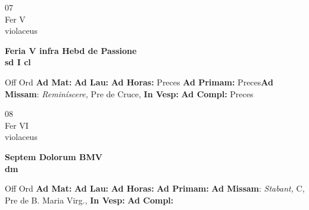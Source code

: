 \documentclass[10pt, openany]{book}
\begin{document}
        \begin{center}
            \begin{minipage}{3.5in}
                \vspace{2em}
                \begin{minipage}{0.5in}
                    {\Huge 07} \\
                    {\normalsize Fer V} \\
                    {\normalsize violaceus}
                \end{minipage}
                \begin{minipage}{3.0in}
                    \textbf{ \large Feria V infra Hebd de Passione \\
                    \textnormal{\normalsize sd I cl}} \\ 
                \end{minipage}
                \begin{justify}Off Ord
                    \textbf{Ad Mat: }
                    \textbf{Ad Lau: }
                    \textbf{Ad Horas: }Preces
                    \textbf{Ad Primam: }Preces\textbf{Ad Missam}: \textit{Reminíscere,} Pre de Cruce,  
                    \textbf{In Vesp: }
                    \textbf{Ad Compl: }Preces
                \end{justify}
            \end{minipage}
        \end{center}
    
        \begin{center}
            \begin{minipage}{3.5in}
                \vspace{2em}
                \begin{minipage}{0.5in}
                    {\Huge 08} \\
                    {\normalsize Fer VI} \\
                    {\normalsize violaceus}
                \end{minipage}
                \begin{minipage}{3.0in}
                    \textbf{ \large Septem Dolorum BMV \\
                    \textnormal{\normalsize dm}} \\ 
                \end{minipage}
                \begin{justify}Off Ord
                    \textbf{Ad Mat: }
                    \textbf{Ad Lau: }
                    \textbf{Ad Horas: }
                    \textbf{Ad Primam: }\textbf{Ad Missam}: \textit{Stabant,} C, Pre de B. Maria Virg.,  
                    \textbf{In Vesp: }
                    \textbf{Ad Compl: }
                \end{justify}
            \end{minipage}
        \end{center}
    
\end{document}
